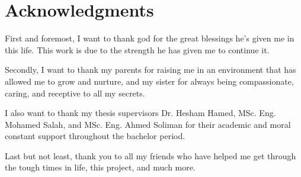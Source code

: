 \chapter*{Acknowledgments}
\label{chap:ack}

First and foremost, I want to thank god for the great blessings he's given me in this life. This work is due to the strength he has given me to continue it.

Secondly, I want to thank my parents for raising me in an environment that has allowed me to grow and nurture, and my sister for always being compassionate, caring, and receptive to all my secrets.

I also want to thank my thesis supervisors Dr. Hesham Hamed, MSc. Eng. Mohamed Salah, and MSc. Eng. Ahmed Soliman for their academic and moral constant support throughout the bachelor period.


Last but not least, thank you to all my friends who have helped me get through the tough times in life, this project, and much more.